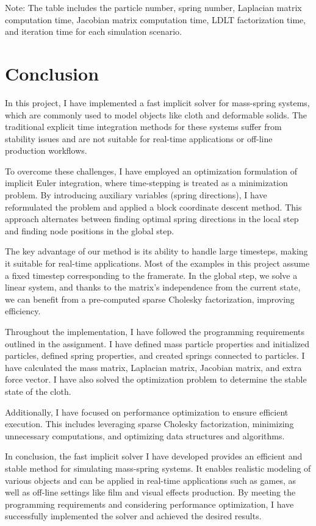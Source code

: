 \documentclass[acmtog]{acmart}
\begin{document}
Note: The table includes the particle number, spring number, Laplacian matrix computation time, Jacobian matrix computation time, LDLT factorization time, and iteration time for each simulation scenario.

\section{Conclusion}

In this project, I have implemented a fast implicit solver for mass-spring systems, which are commonly used to model objects like cloth and deformable solids. The traditional explicit time integration methods for these systems suffer from stability issues and are not suitable for real-time applications or off-line production workflows.

To overcome these challenges, I have employed an optimization formulation of implicit Euler integration, where time-stepping is treated as a minimization problem. By introducing auxiliary variables (spring directions), I have reformulated the problem and applied a block coordinate descent method. This approach alternates between finding optimal spring directions in the local step and finding node positions in the global step.

The key advantage of our method is its ability to handle large timesteps, making it suitable for real-time applications. Most of the examples in this project assume a fixed timestep corresponding to the framerate. In the global step, we solve a linear system, and thanks to the matrix's independence from the current state, we can benefit from a pre-computed sparse Cholesky factorization, improving efficiency.

Throughout the implementation, I have followed the programming requirements outlined in the assignment. I have defined mass particle properties and initialized particles, defined spring properties, and created springs connected to particles. I have calculated the mass matrix, Laplacian matrix, Jacobian matrix, and extra force vector. I have also solved the optimization problem to determine the stable state of the cloth.

Additionally, I have focused on performance optimization to ensure efficient execution. This includes leveraging sparse Cholesky factorization, minimizing unnecessary computations, and optimizing data structures and algorithms.

In conclusion, the fast implicit solver I have developed provides an efficient and stable method for simulating mass-spring systems. It enables realistic modeling of various objects and can be applied in real-time applications such as games, as well as off-line settings like film and visual effects production. By meeting the programming requirements and considering performance optimization, I have successfully implemented the solver and achieved the desired results.
\end{document}
